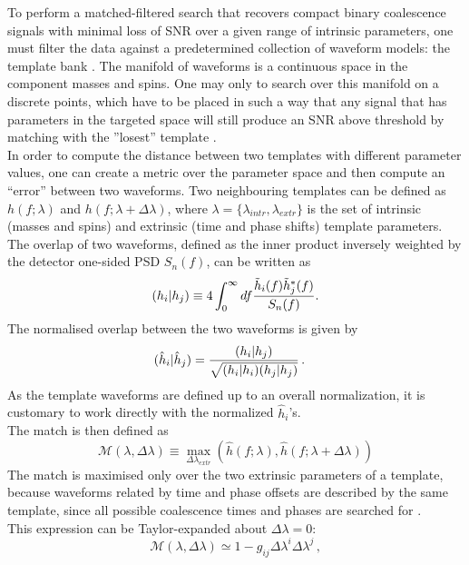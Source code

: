 \documentclass[binding=0.6cm, LaM]{sapthesis}
\begin{document}
	To perform a matched-filtered search that recovers compact binary coalescence signals
	with minimal loss of SNR over a given range of intrinsic parameters, 
	one must filter the data against a predetermined collection of waveform models: the template bank \cite{28}.
	The manifold of waveforms is a continuous space in the component masses and spins. 
	One may only to search over this manifold on a discrete points, 
	which have to be placed in such a way that any signal
	that has parameters in the targeted space will still produce an SNR 
	above threshold by matching with the ''losest'' template \cite{27}. \\ 
	In order to compute the distance between two templates with different parameter values, 
	one can create a metric over the parameter space and then compute an ``error'' between two waveforms.
	Two neighbouring templates can be defined as $h(f;\lambda)$ and $h(f;\lambda + \Delta \lambda)$,
        where $\lambda = \{\lambda_{intr}, \lambda_{extr}\}$ is the set of
        intrinsic (masses and spins) and extrinsic (time and phase shifts) template parameters.
	The overlap of two waveforms, defined as the inner product inversely weighted by the detector one-sided  PSD $S_n(f)$, 
	can be written as  
		\begin{equation}
			(h_i| h_j)  \equiv 4 \int_{0}^{\infty} df {{\tilde h_i(f) \tilde h^*_j(f)} \over {S_n(f)}}.
                \end{equation}
	The normalised overlap between the two waveforms is given by
		\begin{align}
			(\hat{h}_i|\hat{h}_j)& = {{(h_i|h_j)} \over {\sqrt{(h_i| h_i)(h_j| h_j)}}}\,.
		\end{align}
	As the template waveforms are defined up to an overall normalization, 
	it is customary to work directly with the normalized $\hat{h}_i$'s. \\
	The match is then defined as
		\begin{equation}
			\mathcal{M}(\lambda, \Delta \lambda) \equiv \max_{\Delta \lambda_{extr}} (\hat h(f;\lambda), \hat h(f;\lambda + \Delta \lambda))
		\end{equation}
	The match is maximised only over the two extrinsic parameters of a template, 
	because waveforms related by time and phase offsets
	are described by the same template, 
	since all possible coalescence times and phases are searched for \cite{29}. \\
	This expression can be Taylor-expanded about $\Delta \lambda = 0$:
		\begin{equation}
			\mathcal{M}(\lambda, \Delta \lambda) \simeq 1 - g_{ij} \Delta \lambda^i \Delta \lambda^j\,,
		\end{equation}
\end{document}
